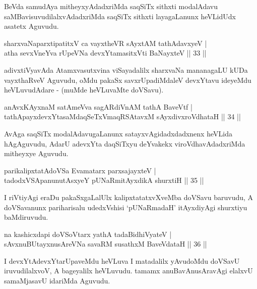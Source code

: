 \begin{artha}
BeVda samudAya mitheyxyAdadxriMda saqSiTx sithxti modalAdavu saMBavisuvudilalxvAdadxriMda saqSiTx sithxti layagaLanunx heVLidUdx asatetx Aguvudu.
\end{artha}

\begin{shl}
sharxvaNaparxtipatitxV ca vayxtheVR sAyxtAM tathA\s davxyeV  | \\
atha sevxVneYva rUpeVNa devxYtamasitxVti BaNayxteV \hfill||  33 ||  
\end{shl}

\begin{artha}
adivxtiVyavAda Atamxvasutxvina viSayadalilx sharxvaNa mananagaLU kUDa vayxthaRveV Aguvudu, oMdu pakaSx savxrUpadiMdaleV devxYtavu ideyeMdu heVLuvudAdare - (muMde heVLuvaMte doVSavu).
\end{artha}
	
\begin{shl}
anAvxKAyxnaM satAmeVva sagARdiVnAM tathA BaveVtf  | \\
tathA\s payxdevxYtasaMdaqSeTxVmaqRSAtavxM sAyxdivxroVdhataH \hfill||  34 ||  
\end{shl}

\begin{artha}
AvAga saqSiTx modalAdavugaLanunx satayxvAgidadxdadxnenx heVLida hAgAguvudu, AdarU adevxYta daqSiTxyu deYvakekx viroVdhavAdadxriMda mitheyxye Aguvudu.
\end{artha}

\begin{shl}
parikalipxtatAdoVSa Evamatarx parxsajayxteV  | \\
tadodxVSApanunutAsxyeY pUNaRmitAyxdikA shurxtiH \hfill||  35 ||  
\end{shl}

\begin{artha}
I riVtiyAgi eraDu pakaSxgaLalUlx kalipxtatatxvXveMba doVSavu baruvudu, A doVSavanunx pariharisalu udedxVshisi `pUNaRmadaH' itAyxdiyAgi shurxtiyu baMdiruvudu.
\end{artha}


\begin{shl}
na kashicxdapi doVSoV\s tarx yathA tadaBidhiVyateV  | \\
sAvxnuBUtayxnusAreVNa savaRM susathxM BaveVdataH \hfill||  36 ||  
\end{shl}

\begin{artha}
I devxYtAdevxYtarUpaveMdu heVLuva I matadalilx yAvudoMdu doVSavU iruvudilalxvoV, A bageyalilx heVLuvudu. tamamx anuBavAnusAravAgi elalxvU samaMjasavU idariMda Aguvudu.
\end{artha}

